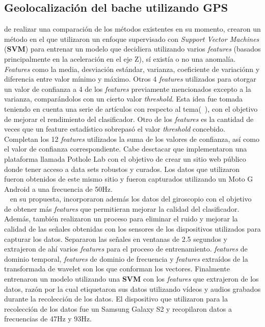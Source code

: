 	\subsection{Geolocalización del bache utilizando GPS}

		 de realizar una comparación de los métodos existentes en su momento, crearon un método en el que utilizaron
		un enfoque supervisado con \emph{Support Vector Machines} (\textbf{SVM}) para entrenar un modelo que decidiera utilizando varios \emph{features}
		(basados principalmente en la aceleración en el eje Z), sí existía o no una anomalía. \emph{Features} como la media, desviación estándar, varianza,
		coeficiente de variaciónn y diferencia entre valor mínimo y máximo. Otros 4 \emph{features} utilizados para otorgar un valor de confianza
		a 4 de los \emph{features} previamente mencionados excepto a la varianza, comparándolos con un cierto valor \emph{threshold}. Esta idea
		fue tomada teniendo en cuenta una serie de artículos con respecto al tema(~), con el objetivo de mejorar el
		rendimiento del clasificador. Otro de los \emph{features} es la cantidad de veces que un feature estadístico sobrepasó el valor \emph
		{threshold} concebido. Completan los 12 \emph{features} utilizados la suma de los valores de confianza, así como el valor de confianza
		correspondiente. Cabe desctacar que implementaron una plataforma llamada Pothole Lab con el objetivo de crear un sitio web público donde
		tener acceso a data sets robustos y curados. Los datos que utilizaron fueron obtenidos de este mismo sitio y fueron capturados utilizando
		un Moto G Android a una frecuencia de 50Hz.\\

		~ en su propuesta, incorporaron además los datos del giroscopio con el objetivo de obtener más \emph{features}
		que permitieran mejorar la calidad del clasificador. Además, también realizaron un proceso para eliminar el ruido y mejorar la calidad de
		las señales obtenidas con los sensores de los dispositivos utilizados para capturar los datos. Separaron las señales en ventanas de 2.5
		segundos y extrajeron de ahí varios \emph{features} para el proceso de entrenamiento. \emph{features} de dominio temporal, \emph{features}
		de dominio de frecuencia y \emph{features} extraídos de la transformada de wavelet son los que conforman los vectores. Finalmente entrenaron
		un modelo utilizando una \textbf{SVM} con los \emph{features} que extrajeron de los datos, razón por la cual etiquetaron sus datos utilizando
		vídeos y audios grabados durante la recolección de los datos. El dispositivo que utilizaron para la recolección de los datos fue un Samsung
		Galaxy S2 y recopilaron datos a frecuencias de 47Hz y 93Hz.\\

